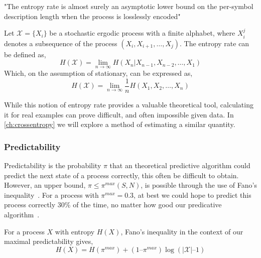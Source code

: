 "The entropy rate is almost surely an asymptotic lower bound on the per-symbol description length when the process is losslessly encoded" 

\begin{definition}\label{def:entropyrate}
	Let  $\mathcal{X}= \{ X_i \}$ be a stochastic ergodic process with a finite alphabet, where $X_i^j$ denotes a subsequence of the process $(X_{i}, X_{i+1}, \ldots, X_{j})$.
	The entropy rate can be defined as,
	\begin{equation}\label{eq:entropyrate}
	H(\mathcal{X})=\lim _{n \rightarrow \infty} H\left(X_{n} | X_{n-1}, X_{n-2}, \ldots, X_{1}\right)
	\end{equation}
	Which, on the assumption of stationary, can be expressed as,
	\begin{equation}
	H(\mathcal{X})=\lim _{n \rightarrow \infty} \frac{1}{n} H\left(X_{1}, X_{2}, \ldots, X_{n}\right)
	\end{equation}
\end{definition}

While this notion of entropy rate provides a valuable theoretical tool, calculating it for real examples can prove difficult, and often impossible given data. In \autoref{ch:crossentropy} we will explore a method of estimating a similar quantity.



\subsubsection{Predictability}

Predictability is the probability $\pi$ that an theoretical predictive algorithm could predict the next state of a process correctly, this often be difficult to obtain. However, an upper bound, $\pi \leq \pi^{max}(S,N)$, is possible through the use of Fano's inequality~\cite{fano_transmission_1961}. For a process with $\pi^{max} = 0.3$, at best we could hope to predict this process correctly 30\% of the time, no matter how good our predicative algorithm~\cite{song_limits_2010}.


\begin{definition}
For a process $X$ with entropy $H(X)$, Fano's inequality in the context of our maximal predictability gives,
\begin{equation}
H(X) = H(\pi^{max}) + (1 – \pi^{max}) \log (|\mathcal{X}| – 1)
\end{equation}
\end{definition}

